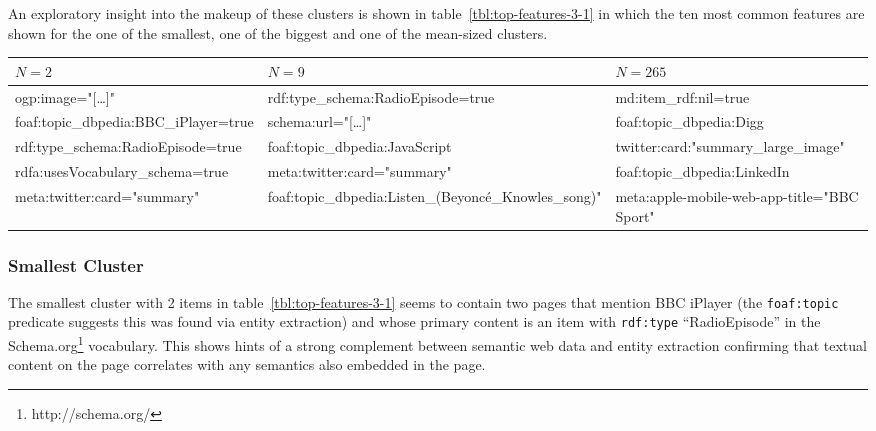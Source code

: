An exploratory insight into the makeup of these clusters is shown
in table~\ref{tbl:top-features-3-1} in which the ten most common
features are shown for the one of the smallest, one of the biggest
and one of the mean-sized clusters.

\begin{sidewaystable}[p]
  \centering
  \begin{tabular}{|l|l|l|}
    $N=2$                                 & $N=9$                                                   & $N=265$                                     \\
    \hline
    ogp:image="[\ldots]"                  & rdf:type\_schema:RadioEpisode=true                      & md:item\_rdf:nil=true                       \\
    foaf:topic\_dbpedia:BBC\_iPlayer=true & schema:url="[\ldots]"                                   & foaf:topic\_dbpedia:Digg                    \\
    rdf:type\_schema:RadioEpisode=true    & foaf:topic\_dbpedia:JavaScript                          & twitter:card:"summary\_large\_image"        \\
    rdfa:usesVocabulary\_schema=true      & meta:twitter:card="summary"                             & foaf:topic\_dbpedia:LinkedIn                \\
    meta:twitter:card="summary"           & foaf:topic\_dbpedia:Listen\_(Beyonc\'e\_Knowles\_song)" & meta:apple-mobile-web-app-title="BBC Sport" \\
  \end{tabular}
  \caption{Ten most common features across the smallest, the largest and a mean-sized cluster produced by the enriched union of dereference and entity extraction}
  \label{tbl:top-features-3-1}
\end{sidewaystable}

\subsubsection{Smallest Cluster}
\label{sec:smallest-cluster}

The smallest cluster with 2 items in table~\ref{tbl:top-features-3-1}
seems to contain two pages that mention BBC iPlayer (the
\texttt{foaf:topic} predicate suggests this was found via entity
extraction) and whose primary content is an item with \texttt{rdf:type}
``RadioEpisode'' in the Schema.org\footnote{http://schema.org/}
vocabulary. This shows hints of a strong complement between semantic
web data and entity extraction confirming that textual content on the
page correlates with any semantics also embedded in the page.

